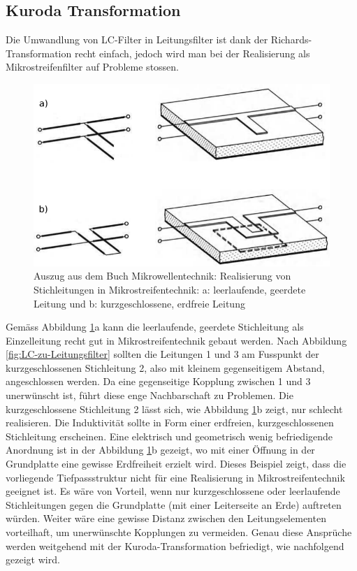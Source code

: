 \subsection{Kuroda Transformation}

Die   Umwandlung   von   LC-Filter   in   Leitungsfilter    ist    dank    der
Richards-Transformation recht einfach, jedoch  wird  man  bei der Realisierung
als Mikrostreifenfilter auf Probleme stossen.

\begin{figure}[h!]
    \centering
    \includegraphics[width=\imagewidth]{images/mikrostreifen}
    \caption{Auszug aus dem Buch Mikrowellentechnik\cite[p.~27]{ref:baechold}: Realisierung von Stichleitungen in Mikrostreifentechnik: a: leerlaufende, geerdete Leitung und b: kurzgeschlossene, erdfreie Leitung}
    \label{fig:mikrostreifen}
\end{figure}

Gem\"ass Abbildung \ref{fig:mikrostreifen}a  kann  die  leerlaufende, geerdete
Stichleitung  als  Einzelleitung  recht  gut  in  Mikrostreifentechnik  gebaut
werden.  Nach Abbildung \ref{fig:LC-zu-Leitungsfilter} sollten die Leitungen 1
und 3 am Fusspunkt  der  kurzgeschlossenen  Stichleitung  2,  also mit kleinem
gegenseitigem  Abstand, angeschlossen werden. Da  eine  gegenseitige  Kopplung
zwischen  1  und  3  unerw\"unscht  ist,  f\"uhrt diese enge Nachbarschaft  zu
Problemen.  Die  kurzgeschlossene  Stichleitung  2 l\"asst sich, wie Abbildung
\ref{fig:mikrostreifen}b zeigt, nur schlecht realisieren.  Die  Induktivit\"at
sollte  in  Form  einer  erdfreien, kurzgeschlossenen Stichleitung erscheinen.
Eine  elektrisch  und  geometrisch  wenig  befriedigende  Anordnung ist in der
Abbildung \ref{fig:mikrostreifen}b  gezeigt,  wo  mit  einer  \"Offnung in der
Grundplatte eine gewisse Erdfreiheit erzielt wird. Dieses Beispiel zeigt, dass
die   vorliegende   Tiefpassstruktur   nicht   f\"ur  eine   Realisierung   in
Mikrostreifentechnik   geeignet  ist.  Es  w\"are  von   Vorteil,   wenn   nur
kurzgeschlossene  oder leerlaufende Stichleitungen gegen die Grundplatte  (mit
einer  Leiterseite  an  Erde) auftreten w\"urden. Weiter w\"are  eine  gewisse
Distanz   zwischen  den  Leitungselementen  vorteilhaft,   um   unerw\"unschte
Kopplungen zu vermeiden.  Genau  diese  Anspr\"uche  werden weitgehend mit der
Kuroda-Transformation    befriedigt,    wie    nachfolgend    gezeigt    wird.


